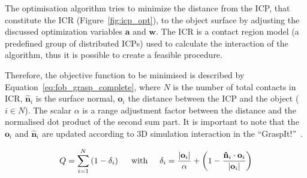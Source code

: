 The optimisation algorithm tries to minimize the distance from the \ac{ICP}, that constitute the \ac{ICR} (Figure~\ref{fig:icp_opt}), to the object surface by adjusting the discussed optimization variables $\mathbf{a}$ and $\mathbf{w}$. The \ac{ICR} is a contact region model (a predefined group of distributed \acp{ICP}) used to calculate the interaction of the algorithm, thus it is possible to create a feasible procedure. 

Therefore, the objective function to be minimised is described by Equation~\ref{eq:fob_grasp_complete}, where $N$ is the number of total contacts in \ac{ICR}, $\mathbf{\hat{n}}_{i}$ is the surface normal, $\mathbf{o}_{i}$ the distance between the \ac{ICP} and the object ($i \in N$). The scalar $\alpha$ is a range adjustment factor between the distance and the normalised dot product of the second sum part. It is important to note that the $\mathbf{o}_{i}$ and $\mathbf{\hat{n}}_{i}$ are updated according to 3D simulation interaction in the ``GraspIt!''~\cite{AndrewT2004}. %

\begin{equation}
Q=\sum_{i=1}^{N}\left(1-\delta_{i}\right)\hspace{0.5cm}\textnormal{with}\hspace{0.5cm}\delta_{i}=\frac{\left|\mathbf{o}_{i}\right|}{\alpha}+\left(1-\frac{\mathbf{\hat{n}}_{i} \cdot\mathbf{o}_{i}}{\left|\mathbf{o}_{i}\right|}\right)
\label{eq:fob_grasp_complete}
\end{equation}


\begin{figure}[h!] %
\end{figure}


